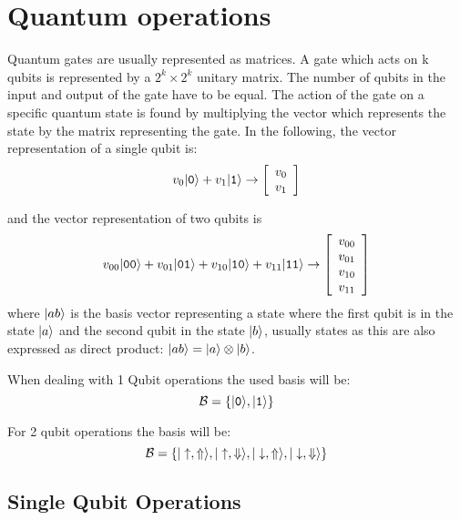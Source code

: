 \chapter{Quantum operations}
\label{operations}
Quantum gates are usually represented as matrices. A gate which acts on k qubits is represented by a $2^k\times2^k$ unitary matrix.
The number of qubits in the input and output of the gate have to be equal. The action of the gate on a specific quantum state is found by multiplying the vector which represents the state by the matrix representing the gate. In the following, the vector representation of a single qubit is:
\begin{equation}
  v_0|\texttt{0}\rangle + v_1|\texttt{1}\rangle \rightarrow \left[\begin{array}{c}
  v_0 \\
  v_1
  \end{array}\right]
\end{equation}

and the vector representation of two qubits is
\begin{equation}
  v_{00}|\texttt{0}\texttt{0}\rangle + v_{01}|\texttt{0}\texttt{1}\rangle + v_{10}|\texttt{1}\texttt{0}\rangle + v_{11}|\texttt{1}\texttt{1}\rangle \rightarrow
  \left[\begin{array}{c}
  v_{00} \\
  v_{01} \\
  v_{10} \\
  v_{11}
  \end{array}\right]
\end{equation}
where $|ab\rangle$ is the basis vector representing a state where the first qubit is in the state $|a\rangle$ and the second qubit in the state $|b\rangle$, usually states as this are also expressed as direct product: $|ab\rangle=|a\rangle\otimes|b\rangle$.

When dealing with 1 Qubit operations the used basis will be:
\begin{equation}
  \mathcal{B} = \left\{|\texttt{0}\rangle,|\texttt{1}\rangle\right\}
\end{equation}

For 2 qubit operations the basis will be:
\begin{equation}  %
  \mathcal{B} = \left\{\ket{\uaw,\Uaw},\ket{\uaw,\Daw},
                       \ket{\daw,\Uaw},\ket{\daw,\Daw}\right\}
\label{basis2}
\end{equation}


\section{Single Qubit Operations}

